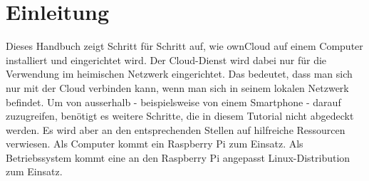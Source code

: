 \section{Einleitung}
Dieses Handbuch zeigt Schritt für Schritt auf, wie ownCloud auf einem Computer installiert und eingerichtet wird.
Der Cloud-Dienst wird dabei nur für die Verwendung im heimischen Netzwerk eingerichtet. Das bedeutet, dass man sich nur mit der Cloud verbinden kann, wenn man sich in seinem lokalen Netzwerk befindet. Um von ausserhalb - beispielsweise von einem Smartphone - darauf zuzugreifen, benötigt es weitere Schritte, die in diesem Tutorial nicht abgedeckt werden. Es wird aber an den entsprechenden Stellen auf hilfreiche Ressourcen verwiesen. Als Computer kommt ein Raspberry Pi zum Einsatz. Als Betriebssystem kommt eine an den Raspberry Pi angepasst Linux-Distribution zum Einsatz.


